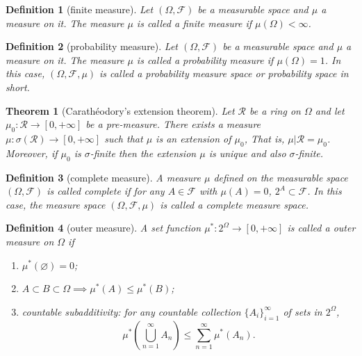 \documentclass{report}
\newtheorem{definition}{Definition}[section]
\newtheorem{theorem}{Theorem}[section]
\theoremstyle{nonumberplain}
\begin{document}
\begin{definition}[finite measure]
	Let $(\Omega,{\mathcal {F}})$ be a measurable space and $\mu$ a measure on it. The measure $\mu$ is called a \emph{finite measure} if $\mu(\Omega)<\infty$.
\end{definition}

\begin{definition}[probability measure]
	Let $(\Omega,{\mathcal {F}})$ be a measurable space and $\mu$ a measure on it. The measure $\mu$ is called a \emph{probability measure} if $\mu(\Omega)=1$. In this case, $(\Omega,{\mathcal {F}},\mu)$ is called a \emph{probability measure space} or \emph{probability space} in short.
\end{definition}

\begin{theorem}[Carathéodory's extension theorem]
	Let $\mathcal{R}$ be a ring on $\Omega$ and let $\mu_0:\mathcal{R}\to[0,+\infty]$ be a pre-measure. There exists a measure $\mu:\sigma(\mathcal{R})\to[0, +\infty]$ such that $\mu$ is an extension of $\mu_0$, That is, $\mu|\mathcal{R} =\mu_0$. Moreover, if $\mu_0$ is $\sigma$-finite then the extension $\mu$ is unique and also $\sigma$-finite.
\end{theorem}
\begin{definition}[complete measure]
	A measure $\mu$ defined on the measurable space $(\Omega,\mathcal{F})$ is called \emph{complete} if for any $A \in \mathcal{F}$ with $\mu(A) = 0$, $2^A \subset \mathcal{F}$. In this case, the measure space $(\Omega,\mathcal{F},\mu)$ is called a complete measure space. 
\end{definition}

\begin{definition}[outer measure]
	A set function $\mu^*:2^\Omega\to[0,+\infty]$  is called a \emph{outer measure} on $\Omega$ if
	\begin{enumerate}
		\item[(a)]$\mu^*(\varnothing) = 0$;
		\item[(b)]$A\subset B\subset\Omega\implies\mu^*(A) \le\mu^*(B)$;
		\item[(b)]countable subadditivity: for any countable collection $\{A_{i}\}_{i=1}^{\infty }$ of sets in $2^\Omega$,
		\[
		\mu^*\left(\bigcup_{n=1}^\infty A_n\right)\le\sum_{n=1}^{\infty}\mu^*(A_n).
		\]
	\end{enumerate}
\end{definition}
\end{document}
